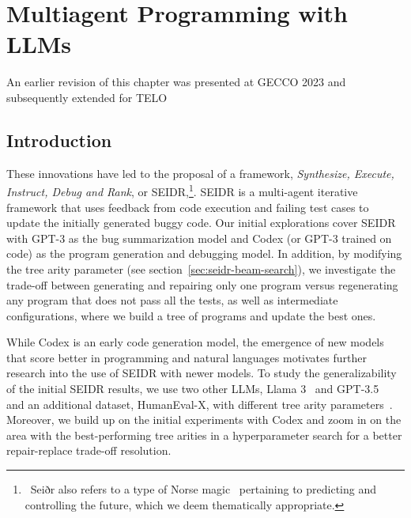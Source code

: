 \chapter{Multiagent Programming with LLMs}
\label{ch:seidr}
\begin{remark}
  An earlier revision of this chapter was presented at GECCO 2023 \cite{liventsevFullyAutonomousProgramming2023} and subsequently extended for TELO \cite{grishinaFullyAutonomousProgramming2025}
\end{remark}

\section{Introduction}
\label{sec:seidr-intro}

These innovations have led to the proposal of a framework, \emph{Synthesize, Execute, Instruct, Debug and Rank}, or SEIDR,\footnote{~Seiðr also refers to a type of Norse magic~\cite{blain2002:nine} pertaining to predicting and controlling the future, which we deem thematically appropriate.}. 
SEIDR is a multi-agent iterative framework that uses feedback from code execution and failing test cases to update the initially generated buggy code. 
Our initial explorations cover SEIDR with GPT-3 as the bug summarization model and Codex (or GPT-3 trained on code) as the program generation and debugging model.  
In addition, by modifying the tree arity parameter (see section~\ref{sec:seidr-beam-search}), we investigate the trade-off between generating and repairing only one program versus regenerating any program that does not pass all the tests, as well as intermediate configurations, where we build a tree of programs and update the best ones.

While Codex is an early code generation model, the emergence of new models that score better in programming and natural languages motivates further research into the use of SEIDR with newer models. 
To study the generalizability of the initial SEIDR results, we use two other LLMs, Llama 3~\cite{grattafioriLlama3Herd2024} and GPT-3.5~\cite{yeComprehensiveCapabilityAnalysis2023} and an additional dataset, HumanEval-X, with different tree arity parameters~\cite{brown2020:language,chenEvaluatingLargeLanguage2021,zheng2023:codegeex}. 
Moreover, we build up on the initial experiments with Codex and zoom in on the area with the best-performing tree arities in a hyperparameter search for a better repair-replace trade-off resolution. 

